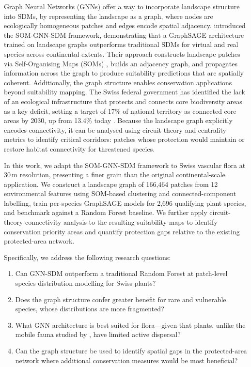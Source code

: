 Graph Neural Networks (GNNs) offer a way to incorporate landscape 
structure into SDMs, by representing the landscape as a graph, where nodes are 
ecologically homogeneous patches and edges encode spatial adjacency. 
\citet{Wu2025} introduced the SOM-GNN-SDM framework, 
demonstrating that a GraphSAGE architecture \citep{Hamilton2017} trained on 
landscape graphs outperforms traditional SDMs for virtual and real
species across continental extents. Their approach constructs landscape patches 
via Self-Organising Maps (SOMs) \citep{Kohonen1982}, builds an adjacency graph, 
and propagates information across the graph to produce suitability predictions 
that are spatially coherent. Additionally, the graph structure enables conservation
applications beyond suitability mapping. The Swiss federal government has identified 
the lack of an ecological infrastructure that protects and connects core 
biodiversity areas as a key deficit, setting a target of 17\% of national 
territory as connected core areas by 2030, up from 13.4\% today 
\citep{FOEN2022,FOEN2025}. Because the landscape graph explicitly encodes 
connectivity, it can be analysed using circuit theory and centrality metrics to 
identify critical corridors: patches whose protection would maintain or restore 
habitat connectivity for threatened species.

In this work, we adapt the SOM-GNN-SDM framework to Swiss vascular flora at 30\,m 
resolution, presenting a finer grain than the original continental-scale 
application. We construct a landscape graph of 166,464 patches from 12 environmental 
features using SOM-based clustering and connected-component labelling, train 
per-species GraphSAGE models for 2,696 qualifying plant species,
and benchmark against a Random Forest baseline. We further apply circuit-theory connectivity 
analysis to the resulting suitability maps to identify conservation priority 
areas and quantify protection gaps relative to the existing protected-area network.

Specifically, we address the following research questions:
\begin{enumerate}[nosep]
  \item Can GNN-SDM outperform a traditional Random Forest at patch-level species distribution modelling for Swiss plants?
  \item Does the graph structure confer greater benefit for rare and vulnerable species, whose distributions are more fragmented?
  \item What GNN architecture is best suited for flora---given that plants, unlike the mobile fauna studied by \citet{Wu2025}, have limited active dispersal?
  \item Can the graph structure be used to identify spatial gaps in the protected-area network where additional conservation measures would be most beneficial?
\end{enumerate}

